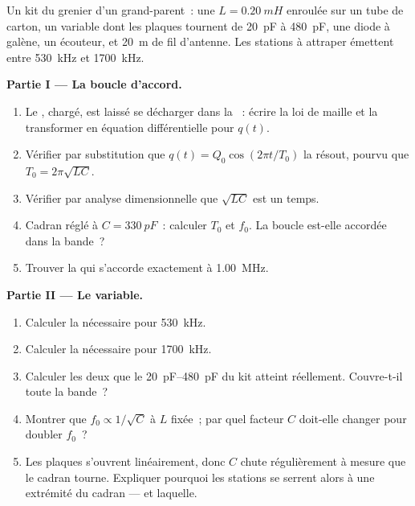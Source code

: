 \begin{problem}
\label{pb:g12:rlc-oscillations:1}
Un kit du grenier d'un grand-parent~: une
 $L = \qty{0.20}{mH}$ enroulée sur un tube
de carton, un  variable dont les plaques
tournent de \qty{20}{pF} à \qty{480}{pF}, une diode à galène, un
écouteur, et \qty{20}{m} de fil d'antenne. Les stations à attraper
émettent entre \qty{530}{kHz} et \qty{1700}{kHz}.

\medskip
\noindent\textbf{Partie I --- La boucle d'accord.}
\begin{enumerate}
  \item Le , chargé, est laissé se décharger
        dans la ~: écrire la loi de maille et
        la transformer en équation différentielle pour $q(t)$.
  \item Vérifier par substitution que $q(t) = Q_0\cos(2\pi t/T_0)$
        la résout, pourvu que $T_0 = 2\pi\sqrt{LC}$.
  \item Vérifier par analyse dimensionnelle que $\sqrt{LC}$ est un
        temps.
  \item Cadran réglé à $C = \qty{330}{pF}$~: calculer $T_0$ et $f_0$.
        La boucle est-elle accordée dans la bande~?
  \item Trouver la  qui s'accorde exactement à
        \qty{1.00}{MHz}.
\end{enumerate}

\medskip
\noindent\textbf{Partie II --- Le 
variable.}
\begin{enumerate}[resume]
  \item Calculer la  nécessaire pour
        \qty{530}{kHz}.
  \item Calculer la  nécessaire pour
        \qty{1700}{kHz}.
  \item Calculer les deux  que le
         \qtyrange{20}{480}{pF} du kit
        atteint réellement. Couvre-t-il toute la bande~?
  \item Montrer que $f_0 \propto 1/\sqrt{C}$ à $L$ fixée~; par quel
        facteur $C$ doit-elle changer pour doubler $f_0$~?
  \item Les plaques s'ouvrent linéairement, donc $C$ chute
        régulièrement à mesure que le cadran tourne. Expliquer
        pourquoi les stations se serrent alors à une extrémité du
        cadran --- et laquelle.
\end{enumerate}


\end{problem}
